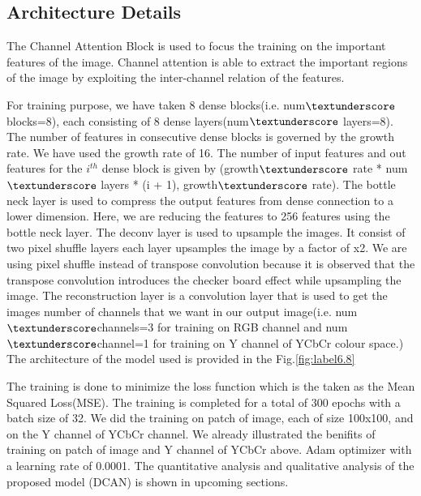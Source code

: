 \subsection{Architecture Details}
The Channel Attention Block is used to focus the training on the important features of the image. Channel attention is able to extract the important regions of the image by exploiting the inter-channel relation of the features.

For training purpose, we have taken 8 dense blocks(i.e. num$\textunderscore $blocks=8), each consisting of 8 dense layers(num$\textunderscore$ layers=8). The number of features in consecutive dense blocks is governed by the growth rate. We have used the growth rate of 16. The number of input features and out features for the $i^{th}$ dense block is given by (growth$\textunderscore$
rate * num$\textunderscore$
layers * (i + 1), growth$\textunderscore$
rate). 
\newline
The bottle neck layer is used to compress the output features from dense connection to a lower dimension. Here, we are reducing the features to 256 features using the bottle neck layer. The deconv layer is used to upsample the images. It consist of two pixel shuffle layers each layer upsamples the image by a factor of x2. We are using pixel shuffle instead of transpose convolution because it is observed that the transpose convolution introduces the checker board effect while upsampling the image. The reconstruction layer is a convolution layer that is used to get the images number of channels that we want in our output image(i.e. num$\textunderscore$channels=3 for training on RGB channel and num$\textunderscore$channel=1 for training on Y channel of YCbCr colour space.)
The architecture of the model used is provided in the Fig.\ref{fig:label6.8}

The training is done to minimize the loss function which is the taken as the Mean Squared Loss(MSE). The training is completed for a total of 300 epochs with a batch size of 32. We did the training on patch of image, each of size 100x100, and on the Y channel of YCbCr channel. We already illustrated the benifits of training on patch of image and Y channel of YCbCr above. Adam optimizer with a learning rate of 0.0001. The quantitative analysis and qualitative analysis of the proposed model (DCAN) is shown in upcoming sections.

